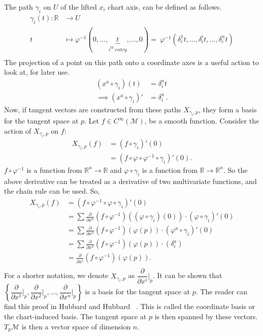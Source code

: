 \documentclass{article}
\theoremstyle{definition}
\theoremstyle{named}
\begin{document}
\noindent The path $\gamma_i$ on $U$ of the lifted $x_i$ chart axis, can be defined as follows.
\begin{align*}
    \gamma_i(t) : \mathbb{R} &\to U\\
     t \  &\mapsto \varphi^{-1}(0, \ldots, \underbrace{t}_{i^{th} \ entry}, \ldots, 0)
     = \ \varphi^{-1}(\delta^1_{i}t, \ldots, \delta^i_{i}t, \ldots, \delta^n_{i}t)\\
\end{align*}
The projection of a point on this path onto a coordinate axes is a useful action to look at, for later use. 
\begin{align*}
    (x^a\circ \gamma_i)(t) &= \delta_i^a t\\
    \implies (x^a\circ \gamma_i)' &= \delta_i^a \ .
\end{align*}
Now, if tangent vectors are constructed from these paths $X_{\gamma_i, p}$, they form a basis for the tangent space at $p$. Let $f \in C^{\infty}(\mathcal{M})$, be a smooth function. Consider the action of $X_{\gamma_i, p}$ on $f$:
\begin{align*}
    X_{\gamma_i, p}(f) &= (f \circ \gamma_i)'(0)\\
    &= (f\circ \varphi \circ \varphi^{-1} \circ \gamma_i)'(0). 
\end{align*}
$f\circ \varphi^{-1}$ is a function from $\mathbb{R}^n \to \mathbb{R}$ and $\varphi \circ \gamma_i$ is a function from $\mathbb{R}\to \mathbb{R}^n$. So the above derivative can be treated as a derivative of two multivariate functions, and the chain rule can be used. So,
\begin{align*}
    X_{\gamma_i, p}(f) &= (f\circ \varphi^{-1} \circ \varphi \circ \gamma_i)'(0)\\
    &= \sum \frac{\partial}{\partial x^a} \left(f\circ \varphi^{-1}\right)((\varphi\circ\gamma_i)(0))\cdot (\varphi\circ\gamma_i)'(0)\\
    &= \sum \frac{\partial}{\partial x^a} \left(f\circ \varphi^{-1}\right)(\varphi(p))\cdot (\varphi^a\circ\gamma_i)'(0)\\
    &= \sum \frac{\partial}{\partial x^a} \left(f\circ \varphi^{-1}\right)(\varphi(p))\cdot (\delta_i^a)\\
    &= \frac{\partial}{\partial x^i} \left(f\circ \varphi^{-1}\right)(\varphi(p)) .\\
\end{align*}
For a shorter notation, we denote
$X_{\gamma_i, p}$ as $\dfrac{\partial}{\partial x^i}\bigg|_p$. It can be shown that $\left\{\dfrac{\partial}{\partial x^1}\bigg|_p, \dfrac{\partial}{\partial x^2}\bigg|_p, \ldots, \dfrac{\partial}{\partial x^n}\bigg|_p\right\}$ is a basis for the tangent space at  $p$. The reader can find this proof in Hubbard and Hubbard~ \cite{hubbard2009vector}.
This is called the coordinate basis or the chart-induced basis. The tangent space at $p$ is then spanned by these vectors. $T_p\mathcal{M}$ is then a vector space of dimension $n$.
\end{document}
